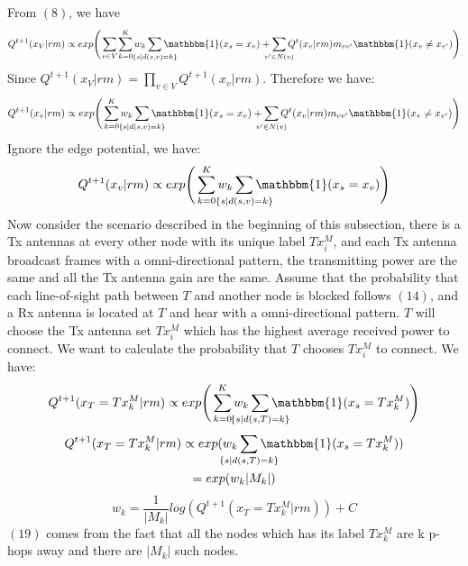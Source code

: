 \documentclass[conference]{IEEEtran}
\begin{document}
From $(8)$, we have 
\begin{equation}
Q^{t+1}(x_{V}|rm) \propto\\
exp \Bigg( \smashoperator{\sum_{\substack{v\in V}}}\sum_{k=0}^{K}w_{k} \smashoperator{\sum_{\substack{\{s|d(s,v)=k\}}}} \mathbbm{1}(x_{s}=x_{v})+ \smashoperator{\sum_{v'\in N(v)}}Q^{t}(x_{v}|rm)m_{vv'} \mathbbm{1}(x_{v}\neq x_{v'})\Bigg)
\end{equation}
Since $Q^{t+1}(x_{V}|rm) = \prod_{v\in V} Q^{t+1}(x_{v}|rm)$. Therefore we have:
\begin{equation}
Q^{t+1}(x_{v}|rm) \propto\\
exp \Bigg( \sum_{k=0}^{K}w_{k} \smashoperator{\sum_{\substack{\{s|d(s,v)=k\}}}} \mathbbm{1}(x_{s}=x_{v})+ \smashoperator{\sum_{v'\in N(v)}}Q^{t}(x_{v}|rm)m_{vv'} \mathbbm{1}(x_{v}\neq x_{v'})\Bigg)
\end{equation}
Ignore the edge potential, we have:
\begin{equation}
Q^{t+1}(x_{v}|rm) \propto\\
exp \Bigg( \sum_{k=0}^{K}w_{k} \smashoperator{\sum_{\substack{\{s|d(s,v)=k\}}}} \mathbbm{1}(x_{s}=x_{v})\Bigg)
\end{equation}
Now consider the scenario described in the beginning of this subsection, there is a Tx antennas at every other node with its unique label $Tx_{i}^{M}$, and each Tx antenna broadcast frames with a omni-directional pattern, the transmitting power are the same and all the Tx antenna gain are the same. Assume that the probability that each line-of-sight path between $T$ and another node is blocked follows $(14)$, and a Rx antenna is located at $T$ and hear with a omni-directional pattern. $T$ will choose the Tx antenna set $Tx_{i}^{M}$ which has the highest average received power to connect. We want to calculate the probability that $T$ chooses $Tx_{i}^{M}$ to connect.  We have:
\begin{equation}
    Q^{t+1}(x_{T}=Tx_{k}^{M}|rm) \propto exp\Bigg( \sum_{k=0}^{K}w_{k} \smashoperator{\sum_{\substack{\{s|d(s,T)=k\}}}} \mathbbm{1}(x_{s}=Tx_{k}^{M})\Bigg)
\end{equation}
\begin{multline}
Q^{t+1}(x_{T}=Tx_{k}^{M}|rm) \propto exp(w_{k}\smashoperator{\sum_{\substack{\{s|d(s,T)=k\}}}}\mathbbm{1}(x_{s}=Tx_{k}^{M})) \\= exp(w_{k}|M_{k}|)
\end{multline}
\begin{equation}
w_{k} = \frac{1}{|M_{k}|} log(Q^{t+1}(x_{T}=Tx_{k}^{M}|rm)) + C
\end{equation}
$(19)$ comes from the fact that all the nodes which has its label $Tx_{k}^{M}$ are k p-hops away and there are $|M_{k}|$ such nodes.
\end{document}
